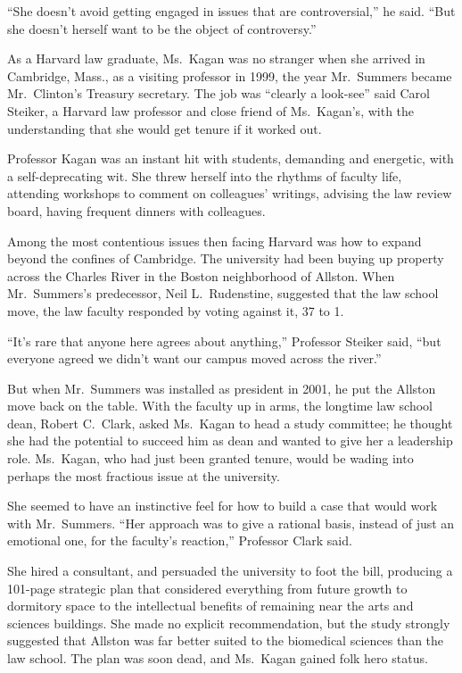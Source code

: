﻿\documentclass[12pt]{article}
\begin{document}
``She doesn't avoid getting engaged in issues that are controversial,'' he said. ``But she doesn't
herself want to be the object of controversy.''

As a Harvard law graduate, Ms.~Kagan was no stranger when she arrived in Cambridge, Mass., as a
visiting professor in 1999, the year Mr.~Summers became Mr.~Clinton's Treasury secretary. The job
was ``clearly a look-see'' said Carol Steiker, a Harvard law professor and close friend of
Ms.~Kagan's, with the understanding that she would get tenure if it worked out.

Professor Kagan was an instant hit with students, demanding and energetic, with a self-deprecating
wit. She threw herself into the rhythms of faculty life, attending workshops to comment on
colleagues' writings, advising the law review board, having frequent dinners with colleagues.

Among the most contentious issues then facing Harvard was how to expand beyond the confines of
Cambridge. The university had been buying up property across the Charles River in the Boston
neighborhood of Allston. When Mr.~Summers's predecessor, Neil L.~Rudenstine, suggested that the law
school move, the law faculty responded by voting against it, 37 to 1.

``It's rare that anyone here agrees about anything,'' Professor Steiker said, ``but everyone agreed
we didn't want our campus moved across the river.''

But when Mr.~Summers was installed as president in 2001, he put the Allston move back on the table.
With the faculty up in arms, the longtime law school dean, Robert C.~Clark, asked Ms.~Kagan to head
a study committee; he thought she had the potential to succeed him as dean and wanted to give her a
leadership role. Ms.~Kagan, who had just been granted tenure, would be wading into perhaps the most
fractious issue at the university.

She seemed to have an instinctive feel for how to build a case that would work with Mr.~Summers.
``Her approach was to give a rational basis, instead of just an emotional one, for the faculty's
reaction,'' Professor Clark said.

She hired a consultant, and persuaded the university to foot the bill, producing a 101-page
strategic plan that considered everything from future growth to dormitory space to the intellectual
benefits of remaining near the arts and sciences buildings. She made no explicit recommendation, but
the study strongly suggested that Allston was far better suited to the biomedical sciences than the
law school. The plan was soon dead, and Ms.~Kagan gained folk hero status.
\end{document}
